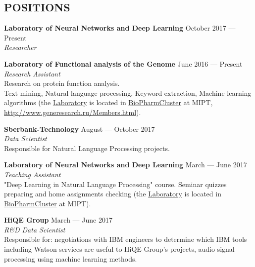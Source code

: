\documentclass[margin, 9pt]{res} %
\begin{document}
\begin{resume}


\section{POSITIONS}

\textbf{Laboratory of Neural Networks and Deep Learning} \hfill October 2017 --- Present \\
{\sl Researcher}

\textbf{Laboratory of Functional analysis of the Genome} \hfill June 2016 --- Present \\
{\sl Research Assistant} \\
Research on protein function analysis.
\\
Text mining, Natural language processing, Keyword extraction, Machine learning \\algorithms (the \href{https://mipt.ru/science/labs/laboratoriya-funktsionalnogo-analiza-genoma/sotrudniki.php}{Laboratory} is located in \href{http://pharmcluster.ru/eng/}{BioPharmCluster} at MIPT, \\ \href{http://www.generesearch.ru/Members.html}{http://www.generesearch.ru/Members.html}).

\textbf{Sberbank-Technology} \hfill August --- October 2017 \\
{\sl Data Scientist} \\
Responsible for Natural Language Processing projects.

\textbf{Laboratory of Neural Networks and Deep Learning} \hfill March --- June 2017 \\
{\sl Teaching Assistant} \\
"Deep Learning in Natural Language Processing" course. Seminar quizzes preparing and home assignments checking (the \href{http://info.deephack.me}{Laboratory} is located in \href{http://pharmcluster.ru/eng/}{BioPharmCluster} at MIPT).

\textbf{HiQE Group} \hfill March --- June 2017 \\
{\sl R\&D Data Scientist} \\
Responsible for: negotiations with IBM engineers to determine which IBM tools including Watson services are useful to HiQE Group's projects, audio signal processing using machine learning methods.



\end{resume}
\end{document}
